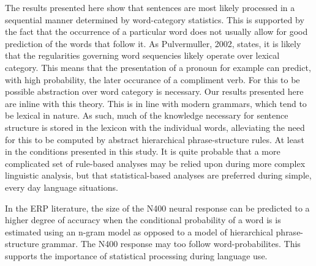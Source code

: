 \documentclass[a4paper,10pt,twoside]{article}
\begin{document}
The results presented here show that sentences are most likely
processed in a sequential manner determined by word-category
statistics. 
%
%
 This is supported by the fact that the occurrence of a
particular word does not usually allow for good prediction of the
words that follow it. As Pulvermuller, 2002, states, it is likely that
the regularities governing word sequencies likely operate over lexical
category. This means that the presentation of a pronoun for example
can predict, with high probability, the later occurance of a
compliment verb. For this to be possible abstraction over word category is
necessary. Our results presented here are inline with this
theory. 
%
%
This is in line with modern grammars, which tend to be lexical in
nature. As such, much of the knowledge necessary for sentence
structure is stored in the lexicon with the individual words,
alleviating the need for this to be computed by abstract hierarchical
phrase-structure rules. At least in the conditions presented in this
study. It is quite probable that a more complicated set of rule-based
analyses may be relied upon during more complex linguistic analysis,
but that statistical-based analyses are preferred during simple, every
day language situations. 
%
%
%
%

%
%
In the ERP literature, the size of the N400 neural response can be
predicted to a higher degree of accuracy when the conditional
probability of a word is is estimated using an n-gram model as opposed
to a model of hierarchical phrase-structure grammar. The N400 response
may too follow word-probabilites. This supports the importance of
statistical processing during language use.

\end{document}
